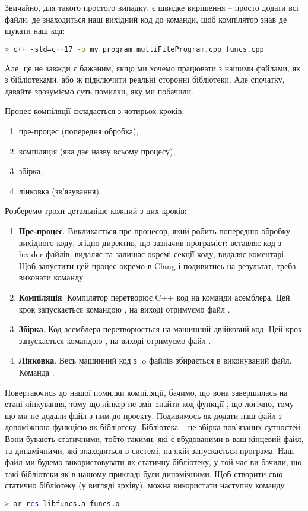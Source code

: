 \documentclass[12pt]{article}
\begin{document}
	Звичайно, для такого простого випадку, є швидке вирішення -- просто додати всі файли, де знаходиться наш вихідний код до команди, щоб компілятор знав де шукати наш код:
	\begin{lstlisting}[language=bash]
		> c++ -std=c++17 -o my_program multiFileProgram.cpp funcs.cpp
	\end{lstlisting}

	Але, це не завжди є бажаним, якщо ми хочемо працювати з нашими  файлами, як з бібліотеками, або ж підключити реальні сторонні бібліотеки. Але спочатку, давайте зрозуміємо суть помилки, яку ми побачили.	
	
	Процес компіляції складається з чотирьох кроків:
	\begin{enumerate}
		\item пре-процес (попередня обробка),
		\item компіляція (яка дає назву всьому процесу),
		\item збірка,
		\item лінковка (зв'язування).
	\end{enumerate}
	Розберемо трохи детальніше кожний з цих кроків:
	\begin{enumerate}
		\item \textbf{Пре-процес}. Викликається пре-процесор, який робить попередню обробку вихідного коду, згідно директив, що зазначив програміст: вставляє код з header файлів, видаляє та залишає окремі секції коду, видаляє коментарі. Щоб запустити цей процес окремо в Clang і подивитись на результат, треба виконати команду .
		\item \textbf{Компіляція}. Компілятор перетворює C++ код на команди асемблера. Цей крок запускається командою , на виході отримуємо файл .
		\item \textbf{Збірка}. Код асемблера перетворюється на машинний двійковий код. Цей крок запускається командою , на виході отримуємо файл .
		\item \textbf{Лінковка}. Весь машинний код з .o файлів збирається в виконуваний файл. Команда .
	\end{enumerate}

	Повертаючись до нашої помилки компіляції, бачимо, що вона завершилась на етапі лінкування, тому що лінкер не зміг знайти код функції , що логічно, тому що ми не додали файл з ним до проекту.
	Подивимось як додати наш файл з допоміжною функцією як бібліотеку. Бібліотека -- це збірка пов'язаних сутностей. Вони бувають статичними, тобто такими, які є вбудованими в ваш кінцевий файл, та динамічними, які знаходяться в системі, на якій запускається програма. Наш файл ми будемо використовувати як статичну бібліотеку, у той час ви бачили, що такі бібліотеки як  в нашому прикладі були динамічними.
	Щоб створити свю статично бібліотеку (у вигляді архіву), можна використати наступну команду
	\begin{lstlisting}[language=bash]
	> ar rcs libfuncs.a funcs.o
	\end{lstlisting}
\end{document}
